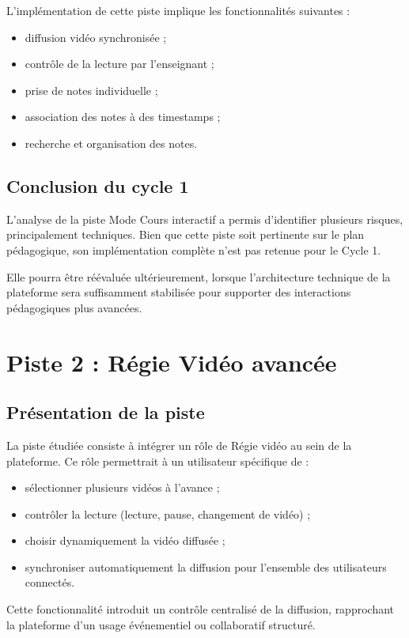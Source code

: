 \documentclass[12pt,a4paper]{report}
\begin{document}
L’implémentation de cette piste implique les fonctionnalités suivantes :
\begin{itemize}
  \item diffusion vidéo synchronisée ;
  \item contrôle de la lecture par l’enseignant ;
  \item prise de notes individuelle ;
  \item association des notes à des timestamps ;
  \item recherche et organisation des notes.
\end{itemize}

\subsection{Conclusion du cycle 1}

L’analyse de la piste Mode Cours interactif a permis d’identifier plusieurs
risques, principalement techniques.
Bien que cette piste soit pertinente sur le plan pédagogique, son implémentation
complète n’est pas retenue pour le Cycle 1.

Elle pourra être réévaluée ultérieurement, lorsque l’architecture technique de
la plateforme sera suffisamment stabilisée pour supporter des interactions
pédagogiques plus avancées.
\newpage
\section{Piste 2 : Régie Vidéo avancée}
\label{sec:piste2}

\subsection{Présentation de la piste}

La piste étudiée consiste à intégrer un rôle de \og Régie vidéo \fg{} au sein de la plateforme.
Ce rôle permettrait à un utilisateur spécifique de :
\begin{itemize}
  \item sélectionner plusieurs vidéos à l’avance ;
  \item contrôler la lecture (lecture, pause, changement de vidéo) ;
  \item choisir dynamiquement la vidéo diffusée ;
  \item synchroniser automatiquement la diffusion pour l’ensemble des utilisateurs connectés.
\end{itemize}
Cette fonctionnalité introduit un contrôle centralisé de la diffusion, rapprochant la plateforme d’un
usage événementiel ou collaboratif structuré.
\end{document}
